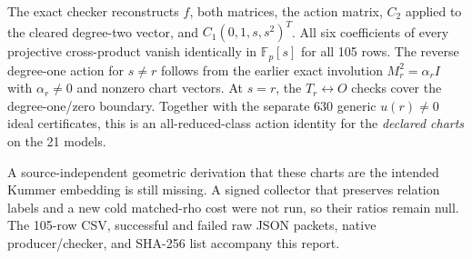 \documentclass[10pt]{article}
\begin{document}
\noindent The exact checker reconstructs $f$, both matrices, the action matrix, $C_2$ applied to the cleared degree-two vector, and $C_1(0,1,s,s^2)^T$. All six coefficients of every projective cross-product vanish identically in $\mathbb F_p[s]$ for all 105 rows. The reverse degree-one action for $s\ne r$ follows from the earlier exact involution $M_r^2=\alpha_r I$ with $\alpha_r\ne0$ and nonzero chart vectors. At $s=r$, the $T_r\leftrightarrow O$ checks cover the degree-one/zero boundary. Together with the separate 630 generic $u(r)\ne0$ ideal certificates, this is an all-reduced-class action identity for the \emph{declared charts} on the 21 models.

\noindent A source-independent geometric derivation that these charts are the intended Kummer embedding is still missing. A signed collector that preserves relation labels and a new cold matched-rho cost were not run, so their ratios remain null. The 105-row CSV, successful and failed raw JSON packets, native producer/checker, and SHA-256 list accompany this report.
\end{document}
